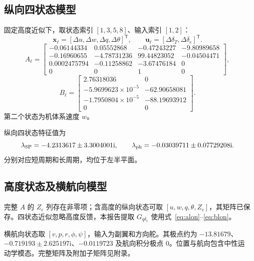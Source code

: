 \documentclass[UTF8,a4paper,11pt,fontset=windows]{ctexart}
\newcommand{\de}{\delta_e}
\newcommand{\dt}{\delta_T}
\newcommand{\Gq}{G_{q\delta_e}}
\begin{document}
\subsection{纵向四状态模型}
固定高度近似下，取状态索引 $[1,3,5,8]$、输入索引 $[1,2]$：
\begin{equation}
\bm x_\ell=[\Delta u,\Delta w,\Delta q,\Delta\theta]^{\mathsf T},\qquad
\bm u_\ell=[\Delta\dt,\Delta\de]^{\mathsf T}.
\end{equation}
\begin{equation}\label{eq:alon}
A_\ell=\begin{bmatrix}
-0.06144334&0.05552868&-0.47243227&-9.80989658\\
-0.16960655&-4.78731236&99.44823052&-0.04504471\\
0.0002475794&-0.11258862&-3.67476184&0\\
0&0&1&0
\end{bmatrix},
\end{equation}
\begin{equation}\label{eq:blon}
B_\ell=\begin{bmatrix}
2.76318036&0\\
-5.9699623\times10^{-5}&-62.90658081\\
-1.7950804\times10^{-5}&-88.19693912\\
0&0
\end{bmatrix}.
\end{equation}
第二个状态为机体系速度 $w$。

纵向四状态特征值为
\begin{equation}
\lambda_{\rm SP}=-4.2313617\pm3.3004001\mathrm i,\qquad
\lambda_{\rm ph}=-0.03039711\pm0.07729208\mathrm i.
\end{equation}
分别对应短周期和长周期，均位于左半平面。

\subsection{高度状态及横航向模型}
完整 $A$ 的 $Z_e$ 列存在非零项；含高度的纵向状态可取 $[u,w,q,\theta,Z_e]$，其矩阵已保存。四状态近似忽略高度反馈，本报告提取 $\Gq$ 使用式~\eqref{eq:alon}--\eqref{eq:blon}。

横航向状态取 $[v,p,r,\phi,\psi]$，输入为副翼和方向舵。其极点约为 $-13.81679$、$-0.719193\pm2.625197\mathrm i$、$-0.0119723$ 及航向积分极点 0。位置与航向包含中性运动学模态。完整矩阵及附加子矩阵见附录。
\end{document}
